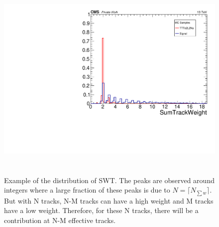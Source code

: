 \documentclass{cernatlasnote}
\begin{document}
\begin{figure}[ht]
\centering
\includegraphics[height=10cm, width=14cm, trim= 0cm 0cm 0cm 0cm,clip]{images/VTXEff/SumTrackWeightCompare.pdf}
\caption{\label{fig:nMTW} Example of the distribution of SWT. The peaks are observed around integers where a large fraction of these peaks is due to $ N = \lceil N_{\sum w}\rceil$. But with N tracks, N-M tracks can have a high weight and M tracks have a low weight. Therefore,  for these N tracks, there will be a contribution at N-M effective tracks.}
\end{figure} 
\end{document}
